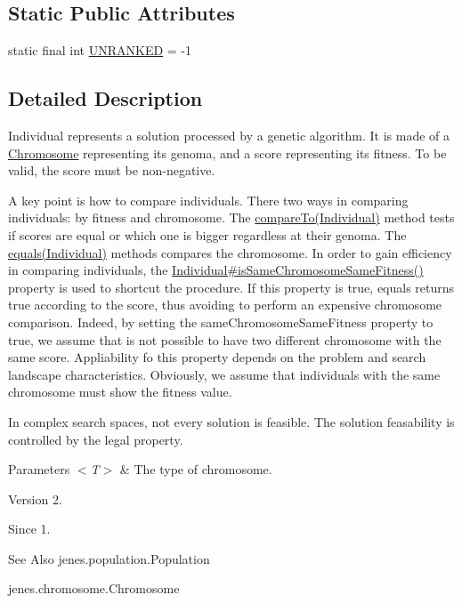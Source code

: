 \subsection*{Static Public Attributes}
\begin{DoxyCompactItemize}
\item 
static final int \hyperlink{classjenes_1_1population_1_1_individual_3_01_t_01extends_01_chromosome_01_4_a6f913202241aa5f7255e482179175f62}{U\-N\-R\-A\-N\-K\-E\-D} = -\/1
\end{DoxyCompactItemize}


\subsection{Detailed Description}
Individual represents a solution processed by a genetic algorithm. It is made of a \hyperlink{}{Chromosome} representing its genoma, and a score representing its fitness. To be valid, the score must be non-\/negative. 

A key point is how to compare individuals. There two ways in comparing individuals\-: by fitness and chromosome. The \hyperlink{}{compare\-To(\-Individual)} method tests if scores are equal or which one is bigger regardless at their genoma. The \hyperlink{}{equals(\-Individual)} methods compares the chromosome. In order to gain efficiency in comparing individuals, the \hyperlink{}{Individual\#is\-Same\-Chromosome\-Same\-Fitness()} property is used to shortcut the procedure. If this property is true, {\ttfamily equals} returns true according to the score, thus avoiding to perform an expensive chromosome comparison. Indeed, by setting the {\ttfamily same\-Chromosome\-Same\-Fitness} property to true, we assume that is not possible to have two different chromosome with the same score. Appliability fo this property depends on the problem and search landscape characteristics. Obviously, we assume that individuals with the same chromosome must show the fitness value. 

In complex search spaces, not every solution is feasible. The solution feasability is controlled by the {\ttfamily legal} property.


\begin{DoxyParams}{Parameters}
{\em $<$\-T$>$} & The type of chromosome.\\
\hline
\end{DoxyParams}
\begin{DoxyVersion}{Version}
2. 
\end{DoxyVersion}
\begin{DoxySince}{Since}
1.
\end{DoxySince}
\begin{DoxySeeAlso}{See Also}
jenes.\-population.\-Population 

jenes.\-chromosome.\-Chromosome 
\end{DoxySeeAlso}


